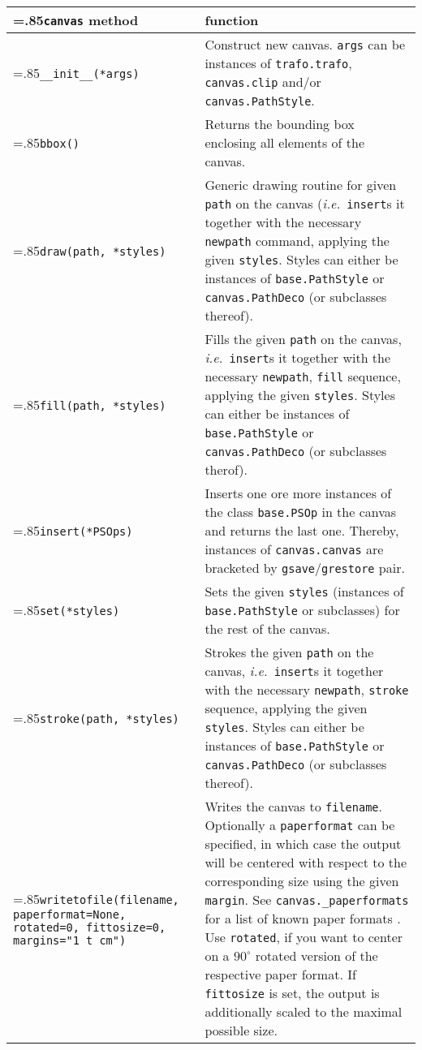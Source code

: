 \medskip
\begin{tabularx}
  {\linewidth}
  {>{\hsize=.85\hsize}X>{\raggedright\arraybackslash\hsize=1.15\hsize}X}
  \texttt{canvas} method & function \\
  \hline
  \texttt{\_\_init\_\_(*args)} & Construct new canvas. \texttt{args}
  can be instances of \texttt{trafo.trafo}, \texttt{canvas.clip}
  and/or \texttt{canvas.PathStyle}.\\
  \texttt{bbox()} &
  Returns the bounding box enclosing all elements of the canvas.\\
  \texttt{draw(path, *styles)} &
  Generic drawing routine for given \texttt{path} on the canvas (\textit{i.e.}\
  \texttt{insert}s it together with the necessary \texttt{newpath}
  command, applying the given \texttt{styles}. Styles can either be instances of
  \texttt{base.PathStyle} or \texttt{canvas.PathDeco} (or subclasses thereof).\\
  \texttt{fill(path, *styles)} &
  Fills the given \texttt{path} on the canvas, \textit{i.e.}\
  \texttt{insert}s it together with the necessary \texttt{newpath},
  \texttt{fill} sequence, applying the given \texttt{styles}. Styles can
  either be instances of \texttt{base.PathStyle} or
  \texttt{canvas.PathDeco} (or subclasses
  therof).\\
  \texttt{insert(*PSOps)} &
  Inserts one ore more instances of the class \texttt{base.PSOp} in the
  canvas and returns the last one. Thereby, instances of \texttt{canvas.canvas} are
  bracketed by \texttt{gsave}/\texttt{grestore} pair. \\
  \texttt{set(*styles)} &
  Sets the given \texttt{styles} (instances of \texttt{base.PathStyle} or
  subclasses) for the rest of the canvas.\\
  \texttt{stroke(path, *styles)} & 
  Strokes the given \texttt{path} on the canvas, \textit{i.e.}\
  \texttt{insert}s it together with the necessary \texttt{newpath},
  \texttt{stroke} sequence, applying the given \texttt{styles}. Styles
  can either be instances of \texttt{base.PathStyle} or
  \texttt{canvas.PathDeco}
  (or subclasses thereof).\\
    \texttt{writetofile(filename, 
      \newline\phantom{writetofile(}paperformat=None, 
      \newline\phantom{writetofile(}rotated=0,
      \newline\phantom{writetofile(}fittosize=0, 
      \newline\phantom{writetofile(}margins="1 t cm")} &
  Writes the canvas to \texttt{filename}. Optionally a
  \texttt{paperformat} can be specified, in which case the output will
  be centered with respect to the corresponding size using the given
  \texttt{margin}. See \texttt{canvas.\_paperformats} for a list of
  known paper formats . Use \texttt{rotated}, if you want to center on
  a $90^\circ$ rotated version of the respective paper format. If
  \texttt{fittosize} is set, the output is additionally scaled to the
  maximal possible size.
\end{tabularx} 
\medskip




